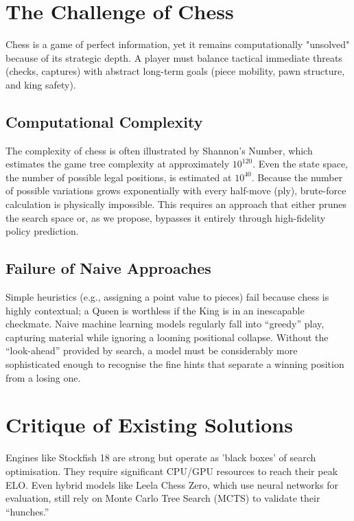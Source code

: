 \section{The Challenge of Chess}
Chess is a game of perfect information, yet it remains computationally "unsolved" because of its strategic depth. A player must balance tactical immediate threats (checks, captures) with abstract long-term goals (piece mobility, pawn structure, and king safety).

\subsection{Computational Complexity}
The complexity of chess is often illustrated by Shannon's Number, which estimates the game tree complexity at approximately \(10^{120}\). Even the state space, the number of possible legal positions, is estimated at \(10^{40}\).
Because the number of possible variations grows exponentially with every half-move (ply), brute-force calculation is physically impossible. This requires an approach that either prunes the search space or, as we propose, bypasses it entirely through high-fidelity policy prediction.

\subsection{Failure of Naive Approaches}
Simple heuristics (e.g., assigning a point value to pieces) fail because chess is highly contextual; a Queen is worthless if the King is in an inescapable checkmate. Naive machine learning models regularly fall into ``greedy'' play, capturing material while ignoring a looming positional collapse. Without the ``look-ahead'' provided by search, a model must be considerably more sophisticated enough to recognise the fine hints that separate a winning position from a losing one.

\section{Critique of Existing Solutions}
Engines like Stockfish 18 are strong but operate as 'black boxes' of search optimisation. They require significant CPU/GPU resources to reach their peak ELO. Even hybrid models like Leela Chess Zero, which use neural networks for evaluation, still rely on Monte Carlo Tree Search (MCTS) \cite{mcts} to validate their ``hunches.''

